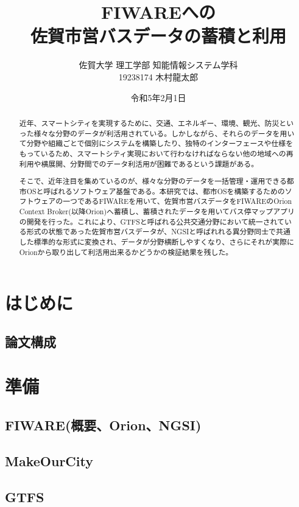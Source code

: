 \documentclass[a4paper, 12pt]{jsreport}
\title{FIWAREへの\\
佐賀市営バスデータの蓄積と利用
}
\author{佐賀大学
理工学部
知能情報システム学科\\
19238174
木村龍太郎}
\date{令和5年2月1日}
\begin{document}
  \maketitle


  \begin{abstract}
    \par 近年、スマートシティを実現するために、交通、エネルギー、環境、観光、防災といった様々な分野のデータが利活用されている。しかしながら、それらのデータを用いて分野や組織ごとで個別にシステムを構築したり、独特のインターフェースや仕様をもっているため、スマートシティ実現において行わなければならない他の地域への再利用や横展開、分野間でのデータ利活用が困難であるという課題がある。
    \par そこで、近年注目を集めているのが、様々な分野のデータを一括管理・運用できる都市OSと呼ばれるソフトウェア基盤である。本研究では、都市OSを構築するためのソフトウェアの一つであるFIWAREを用いて、佐賀市営バスデータをFIWAREのOrion
    Context Broker(以降Orion)へ蓄積し、蓄積されたデータを用いてバス停マップアプリの開発を行った。これにより、GTFSと呼ばれる公共交通分野において統一されている形式の状態であった佐賀市営バスデータが、NGSIと呼ばれれる異分野同士で共通した標準的な形式に変換され、データが分野横断しやすくなり、さらにそれが実際にOrionから取り出して利活用出来るかどうかの検証結果を残した。
  \end{abstract}

  \tableofcontents

  \chapter{はじめに}
  \section{論文構成}


  \chapter{準備}


  \section{FIWARE(概要、Orion、NGSI)}
  \section{MakeOurCity}
  \section{GTFS}
\end{document}
